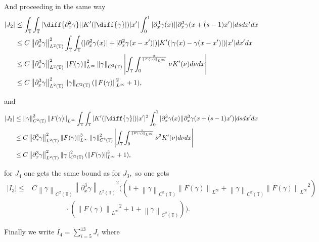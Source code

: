 \documentclass[a4paper]{amsart}
\theoremstyle{definition}
\newcommand{\T}{\ensuremath{\mathbb{T}}}
\newcommand{\Np}[2][\infty]{\ensuremath{\left\|#2\right\|_{L^#1}}}
\newcommand{\Lp}[2][2]{\ensuremath{\left\|#2\right\|_{L^#1(\T)}}}
\newcommand{\Ck}[2][2]{\ensuremath{\left\|#2\right\|_{C^#1(\T)}}}
\begin{document}
    And proceeding in the same way
    \begin{align*}
        |J_2|&\leq \int_\T\int_\T |\diff{\partial_x^2\gamma}| |K'(|\diff{\gamma}|)|x'|\int_0^1 |\partial_x^3\gamma(x)||\partial_x^3\gamma(x+(s-1)x')|ds dx'dx \\
        &\leq C \Lp{\partial_x^3\gamma}^2 \int_\T \int_\T (|\partial_x^2\gamma(x)|+|\partial_x^2\gamma(x-x')|) |K'(|\gamma(x)-\gamma(x-x')|)|x'| dx'dx\\
        &\leq C \Lp{\partial_x^3\gamma}^2 \Np{F(\gamma)}^2 \Ck{\gamma} \left|\int_\T\int_0^{\frac{\pi}{\Np{F(\gamma)}}} \nu K'(\nu) d\nu dx\right|\\
        &\leq C \Lp{\partial_x^3\gamma}^2 \Ck{\gamma} (\Np{F(\gamma)}^2 + 1),
    \end{align*}

    and 
    \begin{align*}
        |J_3|&\leq \Ck{\gamma}^2\Np{F(\gamma)} \int_\T\int_\T |K'(|\diff{\gamma}|)|x'|^2\int_0^1 |\partial_x^3\gamma(x)||\partial_x^3\gamma(x+(s-1)x')|ds dx'dx
        \\ &\leq  C \Lp{\partial_x^3\gamma}^2 \Np{F(\gamma)}^3 \Ck{\gamma}^2\left|\int_\T\int_0^{\frac{\pi}{\Np{F(\gamma)}}} \nu^2 K'(\nu) d\nu dx\right|
        \\ &\leq C \Lp{\partial_x^3\gamma}^2 \Ck{\gamma}^2 (\Np{F(\gamma)}^3+1),
    \end{align*}

    for $J_4$ one gets the same bound as for $J_3,$ so one gets 
    \begin{align*}
        |I_3|\leq& C \Ck{\gamma}\Lp{\partial_x^3\gamma}^2 \bigg( (1+\Ck{\gamma}\Np{F(\gamma)}+\Ck{\gamma}\Np{F(\gamma)}^2)\\ &\hspace{2cm}\cdot(\Np{F(\gamma)}^2+ 1+\Ck{\gamma}) \bigg).
    \end{align*}   

Finally we write $I_4=\sum_{i=5}^{13} J_i$ where
\end{document}
